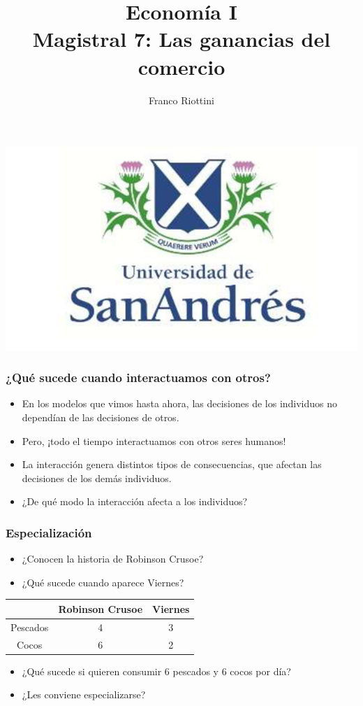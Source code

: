 \documentclass{beamer}
\title[Economía I]{Economía I \vspace{4mm}
\\ Magistral 7: Las ganancias del comercio}
\date{}
\author[Riottini]{Franco Riottini}
\institute[]{Universidad de San Andrés}
\begin{document}
\begin{frame}
\titlepage
\centering
\includegraphics[scale=0.2]{../Figures/logoUDESA.jpg} 
\end{frame}


\begin{frame}
\frametitle{¿Qué sucede cuando interactuamos con otros?}
\begin{itemize}
    \item En los modelos que vimos hasta ahora, las decisiones de los individuos no dependían de las decisiones de otros.
    \item Pero, ¡todo el tiempo interactuamos con otros seres humanos!
    \item La interacción genera distintos tipos de consecuencias, que afectan las decisiones de los demás individuos.
    \item ¿De qué modo la interacción afecta a los individuos? 
\end{itemize} 
\end{frame}

\begin{frame}
\frametitle{Especialización}
    \begin{itemize}
    \item ¿Conocen la historia de Robinson Crusoe?
    \item ¿Qué sucede cuando aparece Viernes?  
    \end{itemize}
    \centering \vspace{4mm}
    \begin{tabular}{|c|c|c|} \hline
        & Robinson Crusoe & Viernes \\ \hline
     Pescados   & 4 & 3 \\ \hline
     Cocos   & 6 & 2 \\ \hline     \end{tabular}
    \begin{itemize}\vspace{4mm}
    \item ¿Qué sucede si quieren consumir 6 pescados y 6 cocos por día? 
    \item ¿Les conviene especializarse?  
    \end{itemize}
\end{frame}
\end{document}
